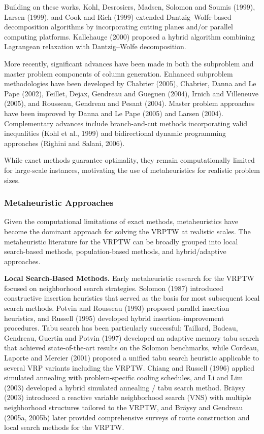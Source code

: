 \documentclass[11pt]{article}
\begin{document}
Building on these works, Kohl, Desrosiers, Madsen, Solomon and Soumis (1999), Larsen (1999), and Cook and Rich (1999) extended Dantzig--Wolfe-based decomposition algorithms by incorporating cutting planes and/or parallel computing platforms. Kallehauge (2000) proposed a hybrid algorithm combining Lagrangean relaxation with Dantzig--Wolfe decomposition.

More recently, significant advances have been made in both the subproblem and master problem components of column generation. Enhanced subproblem methodologies have been developed by Chabrier (2005), Chabrier, Danna and Le Pape (2002), Feillet, Dejax, Gendreau and Gueguen (2004), Irnich and Villeneuve (2005), and Rousseau, Gendreau and Pesant (2004). Master problem approaches have been improved by Danna and Le Pape (2005) and Larsen (2004). Complementary advances include branch-and-cut methods incorporating valid inequalities (Kohl et al., 1999) and bidirectional dynamic programming approaches (Righini and Salani, 2006).

While exact methods guarantee optimality, they remain computationally limited for large-scale instances, motivating the use of metaheuristics for realistic problem sizes.

\subsubsection{Metaheuristic Approaches}

Given the computational limitations of exact methods, metaheuristics have become the dominant approach for solving the VRPTW at realistic scales. The metaheuristic literature for the VRPTW can be broadly grouped into local search-based methods, population-based methods, and hybrid/adaptive approaches.

\textbf{Local Search-Based Methods.} Early metaheuristic research for the VRPTW focused on neighborhood search strategies. Solomon (1987) introduced constructive insertion heuristics that served as the basis for most subsequent local search methods. Potvin and Rousseau (1993) proposed parallel insertion heuristics, and Russell (1995) developed hybrid insertion--improvement procedures. Tabu search has been particularly successful: Taillard, Badeau, Gendreau, Guertin and Potvin (1997) developed an adaptive memory tabu search that achieved state-of-the-art results on the Solomon benchmarks, while Cordeau, Laporte and Mercier (2001) proposed a unified tabu search heuristic applicable to several VRP variants including the VRPTW. Chiang and Russell (1996) applied simulated annealing with problem-specific cooling schedules, and Li and Lim (2003) developed a hybrid simulated annealing / tabu search method. Br\"aysy (2003) introduced a reactive variable neighborhood search (VNS) with multiple neighborhood structures tailored to the VRPTW, and Br\"aysy and Gendreau (2005a, 2005b) later provided comprehensive surveys of route construction and local search methods for the VRPTW.
\end{document}
